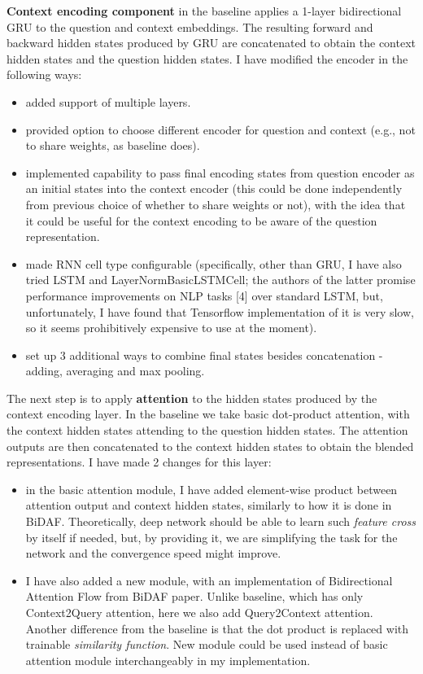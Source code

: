 \documentclass{article}
\begin{document}
{\bf Context encoding component} in the baseline applies a 1-layer bidirectional GRU to the question and context embeddings. The resulting forward and backward hidden states produced by GRU are concatenated to obtain the context hidden states and the question hidden states. I have modified the encoder in the following ways:
\begin{itemize}
\item added support of multiple layers.
\item provided option to choose different encoder for question and context (e.g., not to share
weights, as baseline does).
\item implemented capability to pass final encoding states from question encoder as an initial states into the context encoder (this could be done independently from previous choice of whether to share weights or not), with the idea that it could be useful for the context encoding to be aware of the question representation.
\item made RNN cell type configurable (specifically, other than GRU, I have also tried LSTM and LayerNormBasicLSTMCell; the authors of the latter promise performance improvements on NLP tasks [4] over standard LSTM, but, unfortunately, I have found that Tensorflow implementation of it is very slow, so it seems prohibitively expensive to use at the moment).
\item set up 3 additional ways to combine final states besides concatenation - adding, averaging and max pooling.
\end{itemize}

The next step is to apply {\bf attention} to the hidden states produced by the context encoding layer. In the baseline we take basic dot-product attention, with the context hidden states attending to the question hidden states. The attention outputs are then concatenated to the context hidden states to obtain the
blended representations. I have made 2 changes for this layer:
\begin{itemize}
\item in the basic attention module, I have added element-wise product between attention output and context hidden states, similarly to how it is done in BiDAF. Theoretically, deep network should be able to learn such {\it feature cross} by itself if needed, but, by providing it, we are simplifying the task for the network and the convergence speed might improve.
\item I have also added a new module, with an implementation of Bidirectional Attention Flow from BiDAF paper. Unlike baseline, which has only Context2Query attention, here we also add Query2Context attention. Another difference from the baseline is that the dot product is replaced with trainable {\it similarity function}. New module could be used instead of basic attention module interchangeably in my implementation.
\end{itemize}
\end{document}
